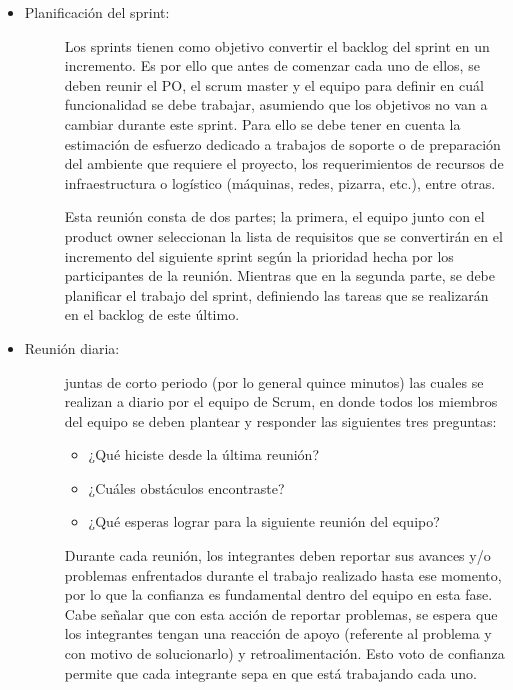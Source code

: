 \begin{itemize}
    \item   \begin{description}
                \item[Planificación del sprint: ] Los sprints tienen como objetivo convertir el back\-log del sprint en un incremento. Es por ello que antes de comenzar cada uno de ellos, se deben reunir el PO, el scrum master y el equipo para definir en cuál funcionalidad se debe trabajar, asumiendo que los objetivos no van a cambiar durante este sprint. Para ello se debe tener en cuenta la estimación de esfuerzo dedicado a trabajos de soporte o de preparación del ambiente que requiere el proyecto, los requerimientos de recursos de infraestructura o logístico (máquinas, redes, pizarra, etc.), entre otras.
                
                Esta reunión consta de dos partes; la primera, el equipo junto con el product owner seleccionan la lista de requisitos que se convertirán en el incremento del siguiente sprint según la prioridad hecha por los participantes de la reunión. Mientras que en la segunda parte, se debe planificar el trabajo del sprint, definiendo las tareas que se realizarán en el backlog de este último.

            \end{description}

    \item   \begin{description}
                \item[Reunión diaria:] juntas de corto periodo (por lo general quince minutos) las cuales se realizan a diario por el equipo de Scrum, en donde todos los miembros del equipo se deben plantear y responder las siguientes tres preguntas:  
                
                \begin{itemize}
                    \item ¿Qué hiciste desde la última reunión?

                    \item ¿Cuáles obstáculos encontraste? 

                    \item ¿Qué esperas lograr para la siguiente reunión del equipo?
                \end{itemize}

                Durante cada reunión, los integrantes deben reportar sus avances y/o problemas enfrentados durante el trabajo realizado hasta ese momento, por lo que la confianza es fundamental dentro del equipo en esta fase. Cabe señalar que con esta acción de reportar problemas, se espera que los integrantes tengan una reacción de apoyo (referente al problema y con motivo de solucionarlo) y retroalimentación. Esto voto de confianza permite que cada integrante sepa en que está trabajando cada uno.
            \end{description}
    

\end{itemize}
